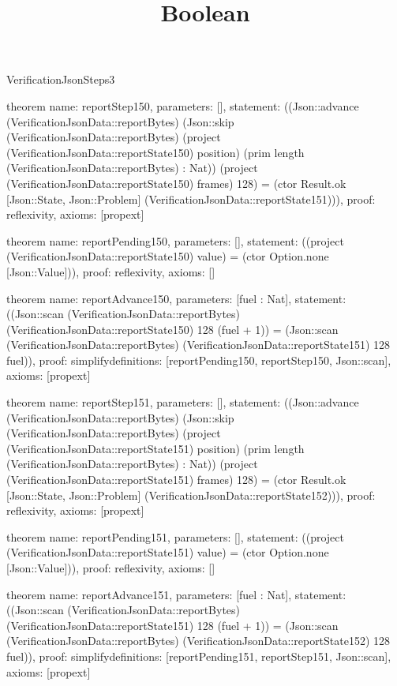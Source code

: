 \begin{lexlean}{VerificationJsonSteps3}
\title{Boolean}
\begin{semanticmodule}

theorem{
  name: reportStep150,
  parameters: [],
  statement: ((Json::advance (VerificationJsonData::reportBytes) (Json::skip (VerificationJsonData::reportBytes) (project (VerificationJsonData::reportState150) position) (prim length (VerificationJsonData::reportBytes) : Nat)) (project (VerificationJsonData::reportState150) frames) 128) = (ctor Result.ok [Json::State, Json::Problem] (VerificationJsonData::reportState151))),
  proof: reflexivity{},
  axioms: [propext]
}

theorem{
  name: reportPending150,
  parameters: [],
  statement: ((project (VerificationJsonData::reportState150) value) = (ctor Option.none [Json::Value])),
  proof: reflexivity{},
  axioms: []
}

theorem{
  name: reportAdvance150,
  parameters: [fuel : Nat],
  statement: ((Json::scan (VerificationJsonData::reportBytes) (VerificationJsonData::reportState150) 128 (fuel + 1)) = (Json::scan (VerificationJsonData::reportBytes) (VerificationJsonData::reportState151) 128 fuel)),
  proof: simplify{definitions: [reportPending150, reportStep150, Json::scan]},
  axioms: [propext]
}

theorem{
  name: reportStep151,
  parameters: [],
  statement: ((Json::advance (VerificationJsonData::reportBytes) (Json::skip (VerificationJsonData::reportBytes) (project (VerificationJsonData::reportState151) position) (prim length (VerificationJsonData::reportBytes) : Nat)) (project (VerificationJsonData::reportState151) frames) 128) = (ctor Result.ok [Json::State, Json::Problem] (VerificationJsonData::reportState152))),
  proof: reflexivity{},
  axioms: [propext]
}

theorem{
  name: reportPending151,
  parameters: [],
  statement: ((project (VerificationJsonData::reportState151) value) = (ctor Option.none [Json::Value])),
  proof: reflexivity{},
  axioms: []
}

theorem{
  name: reportAdvance151,
  parameters: [fuel : Nat],
  statement: ((Json::scan (VerificationJsonData::reportBytes) (VerificationJsonData::reportState151) 128 (fuel + 1)) = (Json::scan (VerificationJsonData::reportBytes) (VerificationJsonData::reportState152) 128 fuel)),
  proof: simplify{definitions: [reportPending151, reportStep151, Json::scan]},
  axioms: [propext]
}


\end{semanticmodule}
\end{lexlean}
